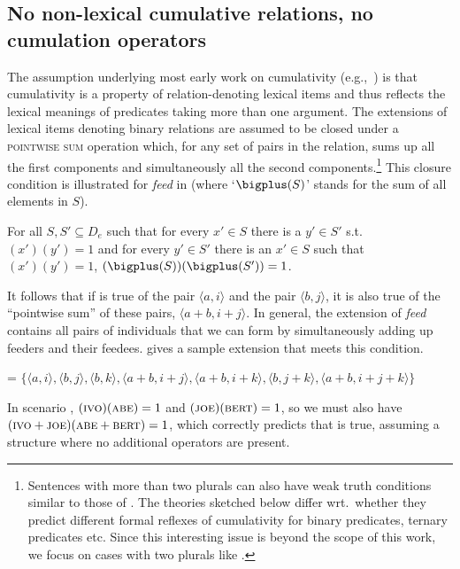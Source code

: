 \documentclass[output=paper]{langscibook}
\begin{document}
\subsection{No non-lexical cumulative relations, no cumulation operators}\label{has-sch:sec:2.1}

The assumption underlying most early work on cumulativity (e.g.,~\citealt{Scha:1981, Krifka:1986}) is that cumulativity is a property of relation-denoting lexical items and thus reflects the lexical meanings of predicates taking more than one argument. The extensions of lexical items denoting binary relations are assumed to be closed under a \textsc{pointwise sum} operation which, for any set of pairs in the relation, sums up all the first components and simultaneously all the second components.\footnote{Sentences with more than two plurals can also have weak truth conditions similar to those of . The theories sketched below differ wrt.~whether they predict different formal reflexes of cumulativity for binary predicates, ternary predicates etc. Since this interesting issue is beyond the scope of this work, we focus on cases with two plurals like .} This closure condition is illustrated for \textit{feed} in  (where `$\bigplus (S)$' stands for the sum of all elements in $S$).

\ea\label{has-sch:ruule} For all $S, S' \subseteq D_{e}$ such that for every $x' \in S$ there is a $y' \in S'$ s.t. $(x')(y') = 1$ and for every $y' \in S'$ there is an $x' \in S$ such that $(x')(y') = 1$, $(\bigplus(S))(\bigplus(S'))= 1$. \z

\noindent It follows that if  is true of the pair ${\langle a, i\rangle}$ and the pair ${\langle b, j\rangle}$, it is also true of the ``pointwise sum'' of these pairs, ${\langle a+b, i+j\rangle}$. In general, the extension of \textit{feed} contains all pairs of individuals that we can form by simultaneously adding up feeders and their feedees.  gives a sample extension that meets this condition.

\ea\label{has-sch:6}  = $\{\langle a, i\rangle, \langle b, j\rangle, \langle b, k\rangle, \langle a+b, i+j\rangle, \langle a+b, i+k\rangle, \langle b, j+k\rangle, \langle a+b, i+j+k\rangle\}$ \z

\noindent In scenario , $(\textsc{ivo})(\textsc{abe}) = 1$ and $(\textsc{joe})(\textsc{bert}) = 1$, so we must also have $(\textsc{ivo}+\textsc{joe})(\textsc{abe}+\textsc{bert}) = 1$, which correctly predicts that  is true, assuming a structure where no additional operators are present.
\end{document}
